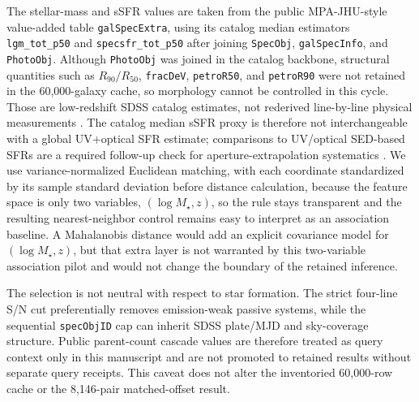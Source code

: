 \documentclass[twocolumn]{aastex631}
\begin{document}
The stellar-mass and sSFR values are taken from the public MPA-JHU-style value-added table \texttt{galSpecExtra}, using its catalog median estimators \texttt{lgm\_tot\_p50} and \texttt{specsfr\_tot\_p50} after joining \texttt{SpecObj}, \texttt{galSpecInfo}, and \texttt{PhotoObj}. Although \texttt{PhotoObj} was joined in the catalog backbone, structural quantities such as \(R_{90}/R_{50}\), \texttt{fracDeV}, \texttt{petroR50}, and \texttt{petroR90} were not retained in the 60,000-galaxy cache, so morphology cannot be controlled in this cycle. Those are low-redshift SDSS catalog estimates, not rederived line-by-line physical measurements \citep{brinchmann2004,sdssdr17,york2000}. The catalog median sSFR proxy is therefore not interchangeable with a global UV+optical SFR estimate; comparisons to UV/optical SED-based SFRs are a required follow-up check for aperture-extrapolation systematics \citep{salim2007}. We use variance-normalized Euclidean matching, with each coordinate standardized by its sample standard deviation before distance calculation, because the feature space is only two variables, $(\log M_\star,z)$, so the rule stays transparent and the resulting nearest-neighbor control remains easy to interpret as an association baseline. A Mahalanobis distance would add an explicit covariance model for $(\log M_\star,z)$, but that extra layer is not warranted by this two-variable association pilot and would not change the boundary of the retained inference.

The selection is not neutral with respect to star formation. The strict four-line S/N cut preferentially removes emission-weak passive systems, while the sequential \texttt{specObjID} cap can inherit SDSS plate/MJD and sky-coverage structure. Public parent-count cascade values are therefore treated as query context only in this manuscript and are not promoted to retained results without separate query receipts. This caveat does not alter the inventoried 60,000-row cache or the 8,146-pair matched-offset result.
\end{document}
